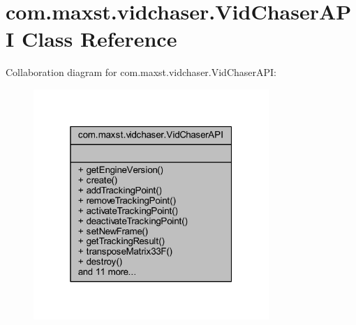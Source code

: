 \hypertarget{classcom_1_1maxst_1_1vidchaser_1_1_vid_chaser_a_p_i}{}\section{com.\+maxst.\+vidchaser.\+Vid\+Chaser\+A\+PI Class Reference}
\label{classcom_1_1maxst_1_1vidchaser_1_1_vid_chaser_a_p_i}


Collaboration diagram for com.\+maxst.\+vidchaser.\+Vid\+Chaser\+A\+PI\+:\nopagebreak
\begin{figure}[H]
\begin{center}
\leavevmode
\includegraphics[width=253pt]{classcom_1_1maxst_1_1vidchaser_1_1_vid_chaser_a_p_i__coll__graph}
\end{center}
\end{figure}
